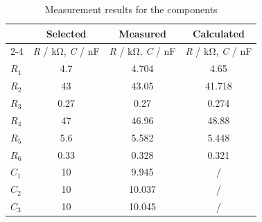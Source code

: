 \begin{table}[ht!]
  \centering
  \caption{Measurement results for the components}
    \renewcommand{\arraystretch}{0.9}

    \begin{tabular}{|l|c|c|c|}
    \hline
    \rowcolor[rgb]{ .816,  .816,  .816}  & \textbf{Selected} & \textbf{Measured} & \textbf{Calculated} \bigstrut\\
    \cline{2-4}\rowcolor[rgb]{ .816,  .816,  .816}\multirow{-2}{*}{\textbf{Component}}&  \textit{R} / kΩ, \textit{C} / nF & \textit{R} / kΩ, \textit{C} / nF & \textit{R} / kΩ, \textit{C} / nF \bigstrut\\
    \hline
    \rowcolor[rgb]{ .816,  .816,  .816} $\textit{R}_1$    & \cellcolor[rgb]{ 1,  1,  1}4.7 & \cellcolor[rgb]{ 1,  1,  1}4.704 & \cellcolor[rgb]{ 1,  1,  1}4.65 \bigstrut\\
    \hline
    \rowcolor[rgb]{ .816,  .816,  .816} $\textit{R}_2$     & \cellcolor[rgb]{ 1,  1,  1}43 & \cellcolor[rgb]{ 1,  1,  1}43.05 & \cellcolor[rgb]{ 1,  1,  1}41.718 \bigstrut\\
    \hline
    \rowcolor[rgb]{ .816,  .816,  .816} $\textit{R}_3$     & \cellcolor[rgb]{ 1,  1,  1}0.27 & \cellcolor[rgb]{ 1,  1,  1}0.27 & \cellcolor[rgb]{ 1,  1,  1}0.274 \bigstrut\\
    \hline
    \rowcolor[rgb]{ .816,  .816,  .816} $\textit{R}_4$     & \cellcolor[rgb]{ 1,  1,  1}47 & \cellcolor[rgb]{ 1,  1,  1}46.96 & \cellcolor[rgb]{ 1,  1,  1}48.88 \bigstrut\\
    \hline
    \rowcolor[rgb]{ .816,  .816,  .816} $\textit{R}_5$     & \cellcolor[rgb]{ 1,  1,  1}5.6 & \cellcolor[rgb]{ 1,  1,  1}5.582 & \cellcolor[rgb]{ 1,  1,  1}5.448 \bigstrut\\
    \hline
    \rowcolor[rgb]{ .816,  .816,  .816} $\textit{R}_6$     & \cellcolor[rgb]{ 1,  1,  1}0.33 & \cellcolor[rgb]{ 1,  1,  1}0.328 & \cellcolor[rgb]{ 1,  1,  1}0.321 \bigstrut\\
    \hline
    \rowcolor[rgb]{ .816,  .816,  .816} $\textit{C}_1$     & \cellcolor[rgb]{ 1,  1,  1}10 & \cellcolor[rgb]{ 1,  1,  1}9.945 & \cellcolor[rgb]{ 1,  1,  1}/ \bigstrut\\
    \hline
    \rowcolor[rgb]{ .816,  .816,  .816} $\textit{C}_2$    & \cellcolor[rgb]{ 1,  1,  1}10 & \cellcolor[rgb]{ 1,  1,  1}10.037 & \cellcolor[rgb]{ 1,  1,  1}/ \bigstrut\\
    \hline
    \rowcolor[rgb]{ .816,  .816,  .816} $\textit{C}_3$    & \cellcolor[rgb]{ 1,  1,  1}10 & \cellcolor[rgb]{ 1,  1,  1}10.045 & \cellcolor[rgb]{ 1,  1,  1}/ \bigstrut\\

\end{tabular}
\end{table}
